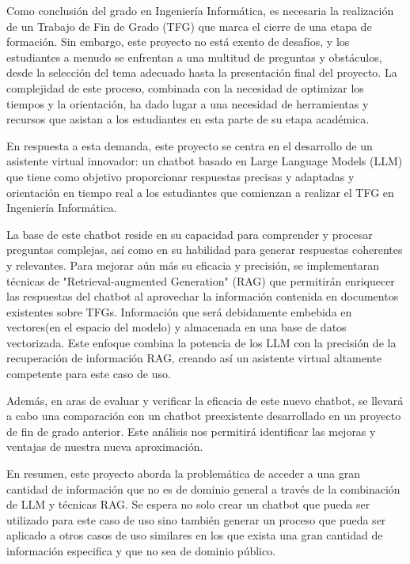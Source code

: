 
Como conclusión del grado en Ingeniería Informática, es necesaria la realización de un Trabajo de Fin de Grado (TFG) que marca el cierre de una etapa de formación. Sin embargo, este proyecto no está exento de desafíos, y los estudiantes a menudo se enfrentan a una multitud de preguntas y obstáculos, desde la selección del tema adecuado hasta la presentación final del proyecto. La complejidad de este proceso, combinada con la necesidad de optimizar los tiempos y la orientación, ha dado lugar a una necesidad de herramientas y recursos que asistan a los estudiantes en esta parte de su etapa académica.

En respuesta a esta demanda, este proyecto se centra en el desarrollo de un asistente virtual innovador: un chatbot basado en Large Language Models (LLM) que tiene como objetivo proporcionar respuestas precisas y adaptadas y orientación en tiempo real a los estudiantes que comienzan a realizar el TFG en Ingeniería Informática.

La base de este chatbot reside en su capacidad para comprender y procesar preguntas complejas, así como en su habilidad para generar respuestas coherentes y relevantes. Para mejorar aún más su eficacia y precisión, se implementaran técnicas de "Retrieval-augmented Generation" (RAG) que permitirán enriquecer las respuestas del chatbot al aprovechar la información contenida en documentos existentes sobre TFGs. Información que será debidamente embebida en vectores(en el espacio del modelo) y almacenada en una base de datos vectorizada. Este enfoque combina la potencia de los LLM con la precisión de la recuperación de información RAG, creando así un asistente virtual altamente competente para este caso de uso.

Además, en aras de evaluar y verificar la eficacia de este nuevo chatbot, se llevará a cabo una comparación con un chatbot preexistente desarrollado en un proyecto de fin de grado anterior. Este análisis nos permitirá identificar las mejoras y ventajas de nuestra nueva aproximación.

En resumen, este proyecto aborda la problemática de acceder a una gran cantidad de información que no es de dominio general a través de la combinación de LLM y técnicas RAG. Se espera no solo crear un chatbot que pueda ser utilizado para este caso de uso sino también generar un proceso que pueda ser aplicado a otros casos de uso similares en los que exista una gran cantidad de información especifica y que no sea de dominio público. 




